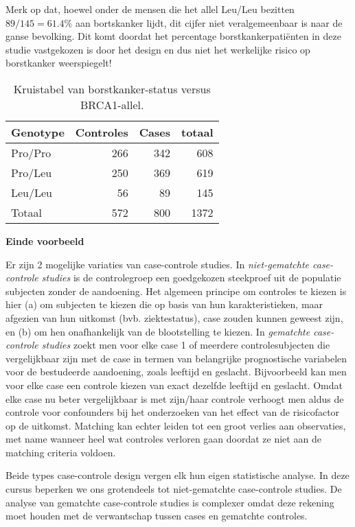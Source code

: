 \documentclass[
  12pt,dutch,coursenotes]{book}
\theoremstyle{definition}
\theoremstyle{definition}
\theoremstyle{definition}
\theoremstyle{remark}
\begin{document}
Merk op dat, hoewel onder de mensen die het allel Leu/Leu bezitten \(89/145=61.4\%\) aan bortskanker lijdt, dit cijfer niet
veralgemeenbaar is naar de ganse bevolking. Dit komt doordat het percentage
borstkankerpatiënten in deze studie vastgekozen is door het design en dus
niet het werkelijke risico op borstkanker weerspiegelt!

\begin{table}

\caption{\label{tab:leu}Kruistabel van borstkanker-status versus BRCA1-allel.}
\centering
\begin{tabular}[t]{lrrr}
\toprule
Genotype & Controles & Cases & totaal\\
\midrule
Pro/Pro & 266 & 342 & 608\\
Pro/Leu & 250 & 369 & 619\\
Leu/Leu & 56 & 89 & 145\\
Totaal & 572 & 800 & 1372\\
\bottomrule
\end{tabular}
\end{table}

\textbf{Einde voorbeeld}

Er zijn 2 mogelijke variaties van case-controle studies. In \emph{niet-gematchte case-controle studies} is de controlegroep een goedgekozen
steekproef uit de populatie subjecten zonder de
aandoening. Het algemeen principe om controles te kiezen is hier (a) om
subjecten te kiezen die op basis van hun karakteristieken,
maar afgezien van hun uitkomst (bvb. ziektestatus), case zouden kunnen
geweest zijn, en (b) om hen onafhankelijk van de blootstelling te kiezen. In
\emph{gematchte case-controle studies} zoekt men voor elke case 1 of
meerdere controlesubjecten die vergelijkbaar zijn met de case in termen van
belangrijke prognostische variabelen voor de bestudeerde aandoening, zoals
leeftijd en geslacht. Bijvoorbeeld kan men voor elke case een controle
kiezen van exact dezelfde leeftijd en geslacht. Omdat elke case nu beter
vergelijkbaar is met zijn/haar controle verhoogt men aldus de controle voor
confounders bij het onderzoeken van het effect van de risicofactor op de
uitkomst. Matching kan echter leiden tot een groot verlies aan observaties,
met name wanneer heel wat controles verloren gaan doordat ze niet aan de
matching criteria voldoen.

Beide types case-controle design vergen elk hun eigen statistische analyse.
In deze cursus beperken we ons grotendeels tot niet-gematchte case-controle studies. De
analyse van gematchte case-controle studies is complexer omdat deze rekening
moet houden met de verwantschap tussen cases en gematchte controles.
\end{document}
